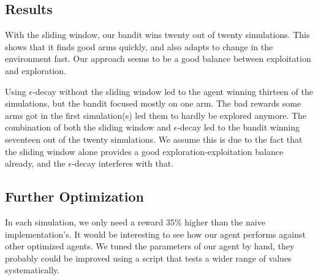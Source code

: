 \documentclass[10pt]{article}
\begin{document}
\subsection{Results}\label{subsec:mab-results}
With the sliding window, our bandit wins twenty out of twenty simulations.
This shows that it finds good arms quickly, and also adapts to change in the environment fast.
Our approach seems to be a good balance between exploitation and exploration.

Using $\epsilon$-decay without the sliding window led to the agent winning thirteen of the simulations, but the bandit focused mostly on one arm.
The bad rewards some arms got in the first simulation(s) led them to hardly be explored anymore.
The combination of both the sliding window and $\epsilon$-decay led to the bandit winning seventeen out of the twenty simulations.
We assume this is due to the fact that the sliding window alone provides a good exploration-exploitation balance already, and the $\epsilon$-decay interferes with that.


\subsection{Further Optimization}\label{subsec:mab-further-optimization}
In each simulation, we only need a reward 35\% higher than the naive implementation's.
It would be interesting to see how our agent performs against other optimized agents.
We tuned the parameters of our agent by hand, they probably could be improved using a script that tests a wider range of values systematically.
\end{document}
